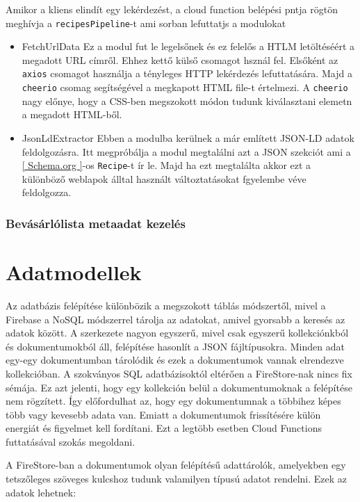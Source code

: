 \documentclass[12pt]{report}
\theoremstyle{definition}
\begin{document}
Amikor a kliens elindít egy lekérdezést, a cloud function belépési pntja rögtön meghívja a \verb+recipesPipeline+-t ami sorban lefuttatjs a modulokat
\begin{itemize}
	\item FetchUrlData
	Ez a modul fut le legelsőnek és ez felelős a HTLM letöltéséért a megadott URL címről. Ehhez kettő külső csomagot hsznál fel.
	Elsőként az \verb+axios+ csomagot használja a tényleges \Gls{HTTP} lekérdezés lefuttatására. Majd a \verb+cheerio+ csomag segítségével a megkapott HTML file-t értelmezi. 
	A \verb+cheerio+ nagy előnye, hogy a CSS-ben megszokott módon tudunk kiválasztani elemetn a megadott HTML-ből. 
	\item JsonLdExtractor
	Ebben a modulba kerülnek a már említett JSON-LD adatok feldolgozásra. Itt megpróbálja a modul megtalálni azt a \Gls{JSON} szekciót ami a \ref{ Schema.org }-os \verb+Recipe+-t ír le.
	Majd ha ezt megtalálta akkor ezt a különböző weblapok álltal használt változtatásokat fgyelembe véve feldolgozza. 

\end{itemize}
\subsection{Bevásárlólista metaadat kezelés}

\chapter{Adatmodellek}
\label{dataSchemes}
Az adatbázis felépítése különbözik a megszokott táblás módszertől, mivel a Firebase a NoSQL módszerrel tárolja az adatokat, amivel gyorsabb a keresés az adatok között. A szerkezete nagyon egyszerű, mivel csak egyszerű kollekciónkból és dokumentumokból áll, felépítése hasonlít a JSON fájltípusokra. Minden adat egy-egy dokumentumban tárolódik és ezek a dokumentumok vannak elrendezve kollekcióban. A szokványos SQL adatbázisoktól eltérően a FireStore-nak nincs fix sémája. Ez azt jelenti, hogy egy kollekción belül a dokumentumoknak a felépítése nem rögzített. Így előfordulhat az, hogy egy dokumentumnak a többihez képes több vagy kevesebb adata van. Emiatt a dokumentumok frissítésére külön energiát és figyelmet kell fordítani. Ezt a legtöbb esetben Cloud Functions futtatásával szokás megoldani.

A FireStore-ban a dokumentumok olyan felépítésű adattárolók, amelyekben egy tetszőleges szöveges kulcshoz tudunk valamilyen típusú adatot rendelni. Ezek az adatok lehetnek: 
\end{document}
